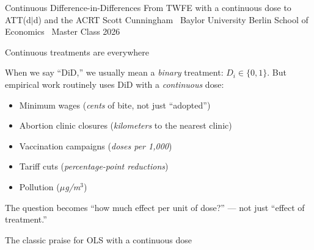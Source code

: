 \documentclass[aspectratio=169,12pt,t]{beamer}
\begin{document}

\codechellatitle
  {Continuous Difference-in-Differences}
  {From TWFE with a continuous dose to ATT(d$|$d) and the ACRT}
  {Scott Cunningham \textperiodcentered\ Baylor University}
  {Berlin School of Economics \textperiodcentered\ Master Class 2026}


\begin{frame}{Continuous treatments are everywhere}
\vspace{0.2cm}

When we say ``DiD,'' we usually mean a \textit{binary} treatment: $D_i \in \{0,1\}$. \;But empirical work routinely uses DiD with a \textit{continuous} dose:

\vspace{0.4cm}
\begin{itemize}\small\setlength\itemsep{1pt}
  \item Minimum wages (\textit{cents} of bite, not just ``adopted'')
  \item Abortion clinic closures (\textit{kilometers} to the nearest clinic)
  \item Vaccination campaigns (\textit{doses per 1{,}000})
  \item Tariff cuts (\textit{percentage-point reductions})
  \item Pollution (\textit{$\mu$g/m$^3$})
\end{itemize}

\vspace{0.3cm}
 \;The question becomes ``how much effect per unit of dose?'' --- not just ``effect of treatment.''
\end{frame}

\begin{frame}{The classic praise for OLS with a continuous dose}
\vspace{0.2cm}


\vspace{0.5cm}


\vspace{0.4em}
\end{frame}
\end{document}

